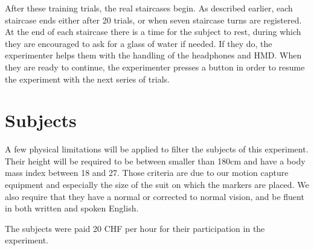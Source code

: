 After these training trials, the real staircases begin. As described earlier, each staircase ends either after 20 trials, or when seven staircase turns are registered. At the end of each staircase there is a time for the subject to rest, during which they are encouraged to ask for a glass of water if needed. If they do, the experimenter helps them with the handling of the headphones and HMD. When they are ready to continue, the experimenter presses a button in order to resume the experiment with the next series of trials.

\section{Subjects}

A few physical limitations will be applied to filter the subjects of this experiment. Their height will be required to be between smaller than 180cm and have a body mass index between 18 and 27. Those criteria are due to our motion capture equipment and especially the size of the suit on which the markers are placed. We also require that they have a normal or corrected to normal vision, and be fluent in both written and spoken English.

The subjects were paid 20 CHF per hour for their participation in the experiment.